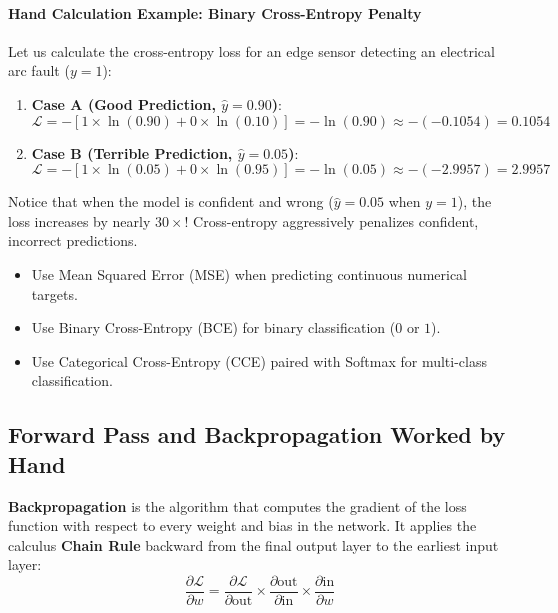 \paragraph{Hand Calculation Example: Binary Cross-Entropy Penalty}
Let us calculate the cross-entropy loss for an edge sensor detecting an electrical arc fault ($y = 1$):
\begin{enumerate}
    \item \textbf{Case A (Good Prediction, $\hat{y} = 0.90$)}:
    \begin{equation*}
    \mathcal{L} = -\left[ 1 \times \ln(0.90) + 0 \times \ln(0.10) \right] = -\ln(0.90) \approx -(-0.1054) = \mathbf{0.1054}
    \end{equation*}
    \item \textbf{Case B (Terrible Prediction, $\hat{y} = 0.05$)}:
    \begin{equation*}
    \mathcal{L} = -\left[ 1 \times \ln(0.05) + 0 \times \ln(0.95) \right] = -\ln(0.05) \approx -(-2.9957) = \mathbf{2.9957}
    \end{equation*}
\end{enumerate}
Notice that when the model is confident and wrong ($\hat{y} = 0.05$ when $y = 1$), the loss increases by nearly $30\times$! Cross-entropy aggressively penalizes confident, incorrect predictions.

\begin{takeaways}
\begin{itemize}
    \item Use Mean Squared Error (MSE) when predicting continuous numerical targets.
    \item Use Binary Cross-Entropy (BCE) for binary classification ($0$ or $1$).
    \item Use Categorical Cross-Entropy (CCE) paired with Softmax for multi-class classification.
\end{itemize}
\end{takeaways}

\subsection{Forward Pass and Backpropagation Worked by Hand}

\begin{keyidea}
\textbf{Backpropagation} is the algorithm that computes the gradient of the loss function with respect to every weight and bias in the network. It applies the calculus \textbf{Chain Rule} backward from the final output layer to the earliest input layer:
\begin{equation}
\frac{\partial \mathcal{L}}{\partial w} = \frac{\partial \mathcal{L}}{\partial \text{out}} \times \frac{\partial \text{out}}{\partial \text{in}} \times \frac{\partial \text{in}}{\partial w}\label{eq:chain_rule}
\end{equation}
\end{keyidea}


